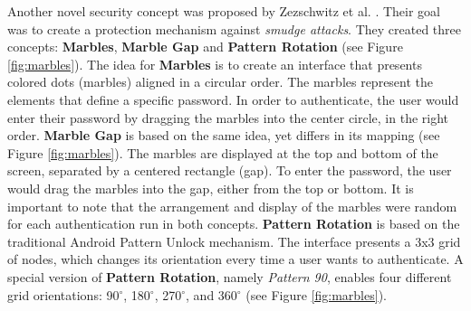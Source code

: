 Another novel security concept was proposed by Zezschwitz et al. \cite{Marbles}. Their goal was to create a protection mechanism against \textit{smudge attacks}. They created three concepts: \textbf{Marbles}, \textbf{Marble Gap} and \textbf{Pattern Rotation} (see Figure \ref{fig:marbles}). The idea for \textbf{Marbles} is to create an interface that presents colored dots (marbles) aligned in a circular order. The marbles represent the elements that define a specific password. In order to authenticate, the user would enter their password by dragging the marbles into the center circle, in the right order. \textbf{Marble Gap} is based on the same idea, yet differs in its mapping (see Figure \ref{fig:marbles}). The marbles are displayed at the top and bottom of the screen, separated by a centered rectangle (gap). To enter the password, the user would drag the marbles into the gap, either from the top or bottom. It is important to note that the arrangement and display of the marbles were random for each authentication run in both concepts. \textbf{Pattern Rotation} is based on the traditional Android Pattern Unlock mechanism. The interface presents a 3x3 grid of nodes, which changes its orientation every time a user wants to authenticate. A special version of \textbf{Pattern Rotation}, namely \textit{Pattern 90}, enables four different grid orientations: 90$^\circ$, 180$^\circ$, 270$^\circ$, and 360$^\circ$ (see Figure \ref{fig:marbles}). \\

